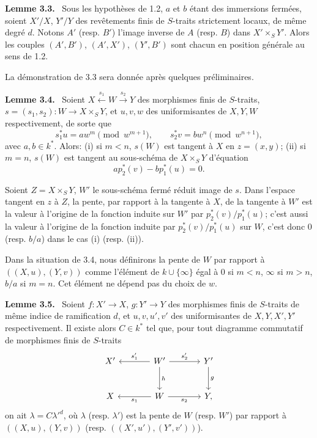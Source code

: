 \documentclass[11pt]{article}
\newenvironment{statement}[1]{\par\medskip\noindent\textbf{#1.}\ }{\par\medskip}
\begin{document}
\begin{statement}{Lemme 3.3}
Sous les hypothèses de 1.2, $a$ et $b$ étant des immersions fermées, soient $X'/X$, $Y'/Y$ des revêtements finis de $S$-traits strictement locaux, de même degré $d$. Notons $A'$ (resp. $B'$) l'image inverse de $A$ (resp. $B$) dans $X'\times_S Y'$. Alors les couples $(A',B')$, $(A',X')$, $(Y',B')$ sont chacun en position générale au sens de 1.2.
\end{statement}

La démonstration de 3.3 sera donnée après quelques préliminaires.

\begin{statement}{Lemme 3.4}
Soient $X\xleftarrow{s_1}W\xrightarrow{s_2}Y$ des morphismes finis de $S$-traits, $s=(s_1,s_2):W\to X\times_SY$, et $u,v,w$ des uniformisantes de $X,Y,W$ respectivement, de sorte que
\[
s_1^*u=aw^m\pmod {w^{m+1}},\qquad
s_2^*v=bw^n\pmod {w^{n+1}},
\]
avec $a,b\in k^*$. Alors: (i) si $m<n$, $s(W)$ est tangent à $X$ en $z=(x,y)$; (ii) si $m=n$, $s(W)$ est tangent au sous-schéma de $X\times_SY$ d'équation
\[
ap_2^*(v)-bp_1^*(u)=0.
\]
\end{statement}

Soient $Z=X\times_SY$, $W'$ le sous-schéma fermé réduit image de $s$. Dans l'espace tangent en $z$ à $Z$, la pente, par rapport à la tangente à $X$, de la tangente à $W'$ est la valeur à l'origine de la fonction induite sur $W'$ par $p_2^*(v)/p_1^*(u)$; c'est aussi la valeur à l'origine de la fonction induite par $p_2^*(v)/p_1^*(u)$ sur $W$, c'est donc $0$ (resp. $b/a$) dans le cas (i) (resp. (ii)).

Dans la situation de 3.4, nous définirons la pente de $W$ par rapport à $((X,u),(Y,v))$ comme l'élément de $k\cup\{\infty\}$ égal à $0$ si $m<n$, $\infty$ si $m>n$, $b/a$ si $m=n$. Cet élément ne dépend pas du choix de $w$.

\begin{statement}{Lemme 3.5}
Soient $f:X'\to X$, $g:Y'\to Y$ des morphismes finis de $S$-traits de même indice de ramification $d$, et $u,v,u',v'$ des uniformisantes de $X,Y,X',Y'$ respectivement. Il existe alors $C\in k^*$ tel que, pour tout diagramme commutatif de morphismes finis de $S$-traits
\[
\begin{tikzcd}[column sep=large,row sep=large]
X' & W' \arrow[l,"s'_1"'] \arrow[r,"s'_2"] \arrow[d,"h"] & Y' \arrow[d,"g"]\\
X & W \arrow[l,"s_1"] \arrow[r,"s_2"'] & Y ,
\end{tikzcd}
\]
on ait $\lambda=C{\lambda'}^d$, où $\lambda$ (resp. $\lambda'$) est la pente de $W$ (resp. $W'$) par rapport à $((X,u),(Y,v))$ (resp. $((X',u'),(Y',v'))$).
\end{statement}
\end{document}
